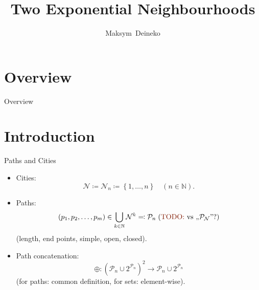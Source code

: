\documentclass[
  size=10pt,
  style=klope,
  paper=screen,
  pauseslide,
  nopagebreaks,
  fleqn
]{powerdot}
\title{Two Exponential Neighbourhoods}
\author{Maksym~Deineko \\ {\small \mailto{max.deineko@gmail.com} }}
\def\todo{\color{red}}
\def\eqitspace{\vspace{-5mm}}
\begin{document}
\maketitle

\section[template=wideslide,tocsection=false,slide=false]{Overview}

\begin{slide}[toc=,bm=]{Overview}
\tableofcontents[content=all,type=1]
\end{slide}

\section[template=wideslide]{Introduction}

\begin{slide}[toc=]{Paths and Cities}
\begin{itemize}
  \item
  Cities:
  \begin{equation}
    \mathcal{N} \coloneqq \mathcal{N}_n \coloneqq \left\{1,\ldots,n\right\}
    \quad (n \in \mathbb{N}).
  \end{equation}%
  \eqitspace
  \item
  Paths:
  \begin{equation}
    \left(p_1,p_2,\ldots,p_m\right) \in \bigcup_{k \in \mathbb{N}}\mathcal{N}^k
    \eqqcolon \mathcal{P}_n \;(\text{{\todo TODO: }vs ,,} \mathcal{P}_\mathcal{N}\text{''?}) %
  \end{equation}%
   (length, end points, simple, open, closed).
  \item
  Path concatenation:
  \begin{equation}
    \oplus: {\left( \mathcal{P}_n \cup 2^{\mathcal{P}_n} \right)}^2 \to \mathcal{P}_n \cup 2^{\mathcal{P}_n}
  \end{equation}%
  (for paths: common definition, for sets: element-wise).
\end{itemize}
\end{slide}
\end{document}
